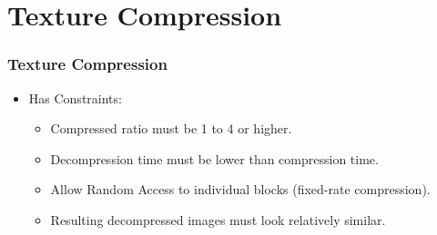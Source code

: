 \documentclass{beamer}
\begin{document}
\begin{frame}
\begin{figure}[!htbp]
\begin{center}
   \end{center}
\end{figure}
\end{frame}

\section{Texture Compression}
\begin{frame}
   \frametitle{Texture Compression}
   \begin{itemize}
   \item{Has Constraints:}
   \pause
      \begin{itemize}
      \item{Compressed ratio must be 1 to 4 or higher.}
      \pause
      \item{Decompression time must be lower than compression time.}
      \pause
      \item{Allow Random Access to individual blocks (fixed-rate compression).}
      \pause
      \item{Resulting decompressed images must look relatively similar.}
      \end{itemize}
   \end{itemize}
\end{frame}
\end{document}
